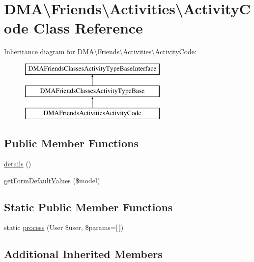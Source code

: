 \hypertarget{classDMA_1_1Friends_1_1Activities_1_1ActivityCode}{}\section{D\+M\+A\textbackslash{}Friends\textbackslash{}Activities\textbackslash{}Activity\+Code Class Reference}
\label{classDMA_1_1Friends_1_1Activities_1_1ActivityCode}
Inheritance diagram for D\+M\+A\textbackslash{}Friends\textbackslash{}Activities\textbackslash{}Activity\+Code\+:\begin{figure}[H]
\begin{center}
\leavevmode
\includegraphics[height=3.000000cm]{d2/d5d/classDMA_1_1Friends_1_1Activities_1_1ActivityCode}
\end{center}
\end{figure}
\subsection*{Public Member Functions}
\begin{DoxyCompactItemize}
\item 
\hyperlink{classDMA_1_1Friends_1_1Activities_1_1ActivityCode_a531ba09241d4bf7c0ad9d862422563c0}{details} ()
\item 
\hyperlink{classDMA_1_1Friends_1_1Activities_1_1ActivityCode_a13eb870ac4e33b0b3d522f0e28444e7e}{get\+Form\+Default\+Values} (\$model)
\end{DoxyCompactItemize}
\subsection*{Static Public Member Functions}
\begin{DoxyCompactItemize}
\item 
static \hyperlink{classDMA_1_1Friends_1_1Activities_1_1ActivityCode_a07ea7959f4707fe2228204c5ff3e51ae}{process} (User \$user, \$params=\mbox{[}$\,$\mbox{]})
\end{DoxyCompactItemize}
\subsection*{Additional Inherited Members}


